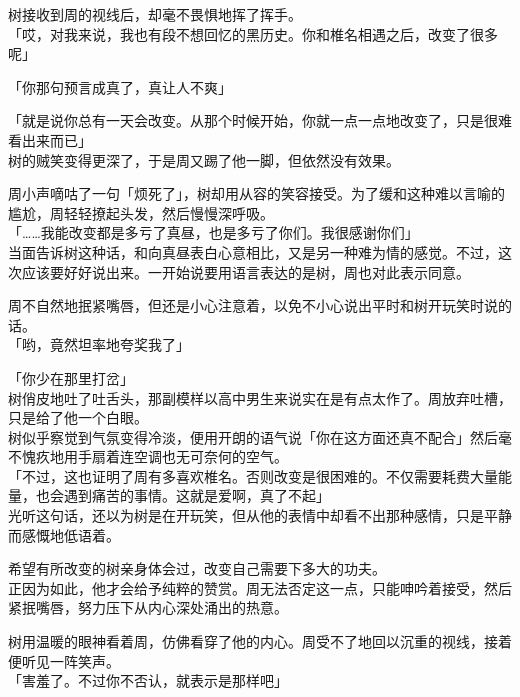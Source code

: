 树接收到周的视线后，却毫不畏惧地挥了挥手。\\

「哎，对我来说，我也有段不想回忆的黑历史。你和椎名相遇之后，改变了很多呢」

「你那句预言成真了，真让人不爽」

「就是说你总有一天会改变。从那个时候开始，你就一点一点地改变了，只是很难看出来而已」\\

树的贼笑变得更深了，于是周又踢了他一脚，但依然没有效果。

周小声嘀咕了一句「烦死了」，树却用从容的笑容接受。为了缓和这种难以言喻的尴尬，周轻轻撩起头发，然后慢慢深呼吸。\\

「……我能改变都是多亏了真昼，也是多亏了你们。我很感谢你们」\\

当面告诉树这种话，和向真昼表白心意相比，又是另一种难为情的感觉。不过，这次应该要好好说出来。一开始说要用语言表达的是树，周也对此表示同意。

周不自然地抿紧嘴唇，但还是小心注意着，以免不小心说出平时和树开玩笑时说的话。\\

「哟，竟然坦率地夸奖我了」

「你少在那里打岔」\\

树俏皮地吐了吐舌头，那副模样以高中男生来说实在是有点太作了。周放弃吐槽，只是给了他一个白眼。\\

树似乎察觉到气氛变得冷淡，便用开朗的语气说「你在这方面还真不配合」然后毫不愧疚地用手扇着连空调也无可奈何的空气。\\

「不过，这也证明了周有多喜欢椎名。否则改变是很困难的。不仅需要耗费大量能量，也会遇到痛苦的事情。这就是爱啊，真了不起」\\

光听这句话，还以为树是在开玩笑，但从他的表情中却看不出那种感情，只是平静而感慨地低语着。

希望有所改变的树亲身体会过，改变自己需要下多大的功夫。\\

正因为如此，他才会给予纯粹的赞赏。周无法否定这一点，只能呻吟着接受，然后紧抿嘴唇，努力压下从内心深处涌出的热意。

树用温暖的眼神看着周，仿佛看穿了他的内心。周受不了地回以沉重的视线，接着便听见一阵笑声。\\

「害羞了。不过你不否认，就表示是那样吧」

